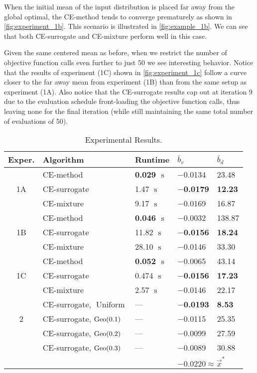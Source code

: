 When the initial mean of the input distribution is placed far away from the global optimal, the CE-method tends to converge prematurely as shown in \cref{fig:experiment_1b}.
This scenario is illustrated in \cref{fig:example_1b}.
We can see that both CE-surrogate and CE-mixture perform well in this case.


Given the same centered mean as before, when we restrict the number of objective function calls even further to just 50 we see interesting behavior.
Notice that the results of experiment (1C) shown in \cref{fig:experiment_1c} follow a curve closer to the far away mean from experiment (1B) than from the same setup as experiment (1A). Also notice that the CE-surrogate results cap out at iteration 9 due to the evaluation schedule front-loading the objective function calls, thus leaving none for the final iteration (while still maintaining the same total number of evaluations of 50).

\begin{table}[!ht]
    \small
    \centering
    \caption{\label{tab:cem_results} Experimental Results.}
    \begin{tabular}{cllll}
    \toprule
    \textbf{Exper.} & \textbf{Algorithm} & \textbf{Runtime} & $\bar{b}_v$ & $\bar{b}_d$\\
    \midrule
    \multirow{3}{*}{1A} & CE-method & \textbf{0.029 $\operatorname{s}$} & $-$0.0134 & 23.48\\
    &CE-surrogate & 1.47 $\operatorname{s}$ & \textbf{\boldmath$-$0.0179} & \textbf{12.23}\\
    &CE-mixture & 9.17 $\operatorname{s}$ & $-$0.0169 & 16.87\\
    \midrule
    \multirow{3}{*}{1B} & CE-method & \textbf{0.046 $\operatorname{s}$} & $-$0.0032 & 138.87\\
    &CE-surrogate & 11.82 $\operatorname{s}$ & \textbf{\boldmath$-$0.0156} & \textbf{18.24}\\
    &CE-mixture & 28.10 $\operatorname{s}$ & $-$0.0146 & 33.30\\
    \midrule
    \multirow{3}{*}{1C} & CE-method & \textbf{0.052 $\operatorname{s}$} & $-$0.0065 & 43.14\\
    &CE-surrogate & 0.474 $\operatorname{s}$ & \textbf{\boldmath$-$0.0156} & \textbf{17.23}\\
    &CE-mixture & 2.57 $\operatorname{s}$ & $-$0.0146 & 22.17\\
    \midrule
    \multirow{3}{*}{2} & CE-surrogate, $\operatorname{Uniform}$ & --- & \textbf{\boldmath$-$0.0193} & \textbf{8.53}\\
    &CE-surrogate, $\operatorname{Geo}(0.1)$ & {\color{gray}---} & $-$0.0115 & 25.35\\
    &CE-surrogate, $\operatorname{Geo}(0.2)$ & {\color{gray}---} & $-$0.0099 & 27.59\\
    &CE-surrogate, $\operatorname{Geo}(0.3)$ & {\color{gray}---} & $-$0.0089 & 30.88\\
    \bottomrule
    & & & \multicolumn{2}{l}{$-\text{0.0220} \approx\vec{x}^*$}\\
    \end{tabular}
\end{table}


